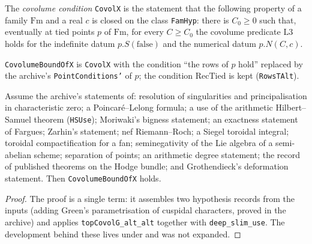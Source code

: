 \begin{definition}\label{geob:covolx}
The \emph{covolume condition} \texttt{CovolX} is the statement that the
following property of a family $\mathrm{Fm}$ and a real $c$ is closed on the
class \texttt{FamHyp}: there is $C_0\ge0$ such that, eventually at tied points
$p$ of $\mathrm{Fm}$, for every $C\ge C_0$ the covolume predicate
$\mathrm{L3}$ holds for the indefinite datum $p.S(\mathrm{false})$ and the
numerical datum $p.N(C,c)$.
\end{definition}

\begin{definition}\label{geob:covolbound}
\texttt{CovolumeBoundOfX} is \texttt{CovolX} with the condition ``the rows of
$p$ hold'' replaced by the archive's \texttt{PointConditions'} of $p$; the
condition $\mathrm{RecTied}$ is kept (\texttt{RowsTAlt}).
\end{definition}

\begin{theorem}\label{geob:covolsupply}
Assume the archive's statements of: resolution of singularities and
principalisation in characteristic zero; a Poincaré--Lelong formula; a use of
the arithmetic Hilbert--Samuel theorem (\texttt{HSUse}); Moriwaki's bigness
statement; an exactness statement of Fargues; Zarhin's statement; nef
Riemann--Roch; a Siegel toroidal integral; toroidal compactification for a fan;
seminegativity of the Lie algebra of a semi-abelian scheme; separation of
points; an arithmetic degree statement; the record of published theorems on
the Hodge bundle; and Grothendieck's deformation statement. Then
\texttt{CovolumeBoundOfX} holds.
\end{theorem}
\begin{proof}
The proof is a single term: it assembles two hypothesis records from the
inputs (adding Green's parametrisation of cuspidal characters, proved in the
archive) and applies \texttt{topCovolG\_alt\_alt} together with
\texttt{deep\_slim\_use}. The development behind these lives under
and was not expanded.
\end{proof}

